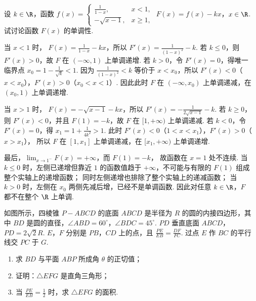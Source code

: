 \begin{problem}
设 \(k \in \R\)，函数 \(f(x) = \begin{cases}
\frac{1}{1 - x}, & x < 1,\\
-\sqrt{x - 1}, & x \geqslant 1,
\end{cases}\) \(F(x) = f(x) - kx\)，\(x \in \R\). 试讨论函数 \(F(x)\) 的单调性.
\end{problem}

\begin{solution}
当 \(x<1\) 时，
\(F(x)=\frac1{1-x}-kx\)，所以
\(F'(x)=\frac1{(1-x)^2}-k\).
若 \(k\leqslant0\)，则 \(F'(x)>0\)，故 \(F\) 在
\((-\infty,1)\) 上单调递增.
若 \(k>0\)，令 \(F'(x)=0\)，得唯一临界点
\(x_0=1-\frac1{\sqrt{k}}<1\). 因为
\(\frac1{(1-x)^2}<k\) 等价于 \(x<x_0\)，所以
\(F'(x)<0\)（\(x<x_0\)），\(F'(x)>0\)（\(x_0<x<1\)）.
因此此时 \(F\) 在 \((-\infty,x_0)\) 上单调递减，在
\((x_0,1)\) 上单调递增.

当 \(x>1\) 时，
\(F(x)=-\sqrt{x-1}-kx\)，所以
\(F'(x)=-\frac1{2\sqrt{x-1}}-k\).
若 \(k\geqslant0\)，则 \(F'(x)<0\)，并且
\(F(1)=-k\)，故 \(F\) 在 \([1,+\infty)\) 上单调递减.
若 \(k<0\)，令 \(F'(x)=0\)，得
\(x_1=1+\frac1{4k^2}>1\). 此时
\(F'(x)<0\)（\(1<x<x_1\)），\(F'(x)>0\)（\(x>x_1\)），
所以 \(F\) 在 \([1,x_1]\) 上单调递减，在
\([x_1,+\infty)\) 上单调递增.

最后，\(\displaystyle\lim_{x\to1^-}F(x)=+\infty\)，而 \(F(1)=-k\)，
故函数在 \(x=1\) 处不连续. 当 \(k\leqslant0\) 时，左侧已递增但靠近 \(1\) 的函数值趋于
\(+\infty\)，不可能与有限的 \(F(1)\) 组成整个实轴上的递增函数；
同时左侧递增也排除了整个实轴上的递减函数；
当 \(k>0\) 时，左侧在 \(x_0\) 两侧先减后增，已经不是单调函数.
因此对任意 \(k\in\R\)，\(F\) 都不在整个 \(\R\) 上单调.
\end{solution}

\begin{problem}
如图所示，四棱锥 \(P - ABCD\) 的底面 \(ABCD\) 是半径为 \(R\) 的圆的内接四边形，其中 \(BD\) 是圆的直径，\(\angle ABD = 60^\circ\)，\(\angle BDC = 45^\circ\). \(PD\) 垂直底面 \(ABCD\)，\(PD = 2\sqrt{2}R\). \(E\)，\(F\) 分别是 \(PB\)，\(CD\) 上的点，且 \(\frac{PE}{EB} = \frac{DF}{FC}\). 过点 \(E\) 作 \(BC\) 的平行线交 \(PC\) 于 \(G\).

\begin{enumerate}
\item 求 \(BD\) 与平面 \(ABP\) 所成角 \(\theta\) 的正切值；
\item 证明：\(\triangle EFG\) 是直角三角形；
\item 当 \(\frac{PE}{EB} = \frac{1}{2}\) 时，求 \(\triangle EFG\) 的面积.
\end{enumerate}
\end{problem}

